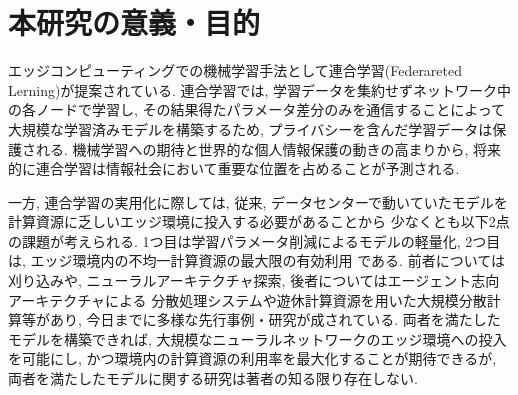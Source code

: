 \documentclass[a4paper,10.5pt,twocolumn]{jsarticle}
\begin{document}


\graphicspath{{./figs/}} %

\section{本研究の意義・目的}

エッジコンピューティングでの機械学習手法として連合学習(Federareted Lerning)が提案されている.
連合学習では, 学習データを集約せずネットワーク中の各ノードで学習し, 
その結果得たパラメータ差分のみを通信することによって
大規模な学習済みモデルを構築するため, プライバシーを含んだ学習データは保護される.
機械学習への期待と世界的な個人情報保護の動きの高まりから, 
将来的に連合学習は情報社会において重要な位置を占めることが予測される.

一方, 連合学習の実用化に際しては, 
従来, データセンターで動いていたモデルを計算資源に乏しいエッジ環境に投入する必要があることから
少なくとも以下2点の課題が考えられる.
1つ目は学習パラメータ削減によるモデルの軽量化, 
2つ目は, エッジ環境内の不均一計算資源の最大限の有効利用
である.
前者については刈り込みや, ニューラルアーキテクチャ探索, 後者についてはエージェント志向アーキテクチャによる
分散処理システムや遊休計算資源を用いた大規模分散計算等があり, 
今日までに多様な先行事例・研究が成されている. 
両者を満たしたモデルを構築できれば, 
大規模なニューラルネットワークのエッジ環境への投入を可能にし, 
かつ環境内の計算資源の利用率を最大化することが期待できるが,  
両者を満たしたモデルに関する研究は著者の知る限り存在しない.
\end{document}
